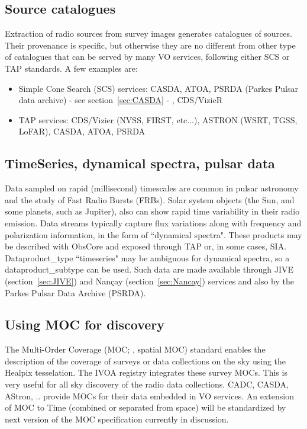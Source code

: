 \documentclass[11pt,a4paper]{ivoa}
\begin{document}
\subsection{Source catalogues}
Extraction of radio sources from survey images generates catalogues of sources. Their provenance is specific, but otherwise they are no different from other type of catalogues that can be served by many VO services, following either SCS \citep{std:SCS} or TAP standards. A few examples are:
\begin{itemize}
\item Simple Cone Search (SCS) services: CASDA, ATOA, PSRDA (Parkes Pulsar data archive) - see section~\ref{sec:CASDA} - , CDS/VizieR
\item TAP services: CDS/Vizier (NVSS, FIRST, etc...), ASTRON (WSRT, TGSS, LoFAR), CASDA, ATOA, PSRDA 
\end{itemize}


\subsection{TimeSeries, dynamical spectra, pulsar data}

Data sampled on rapid (millisecond) timescales are common in pulsar astronomy and the study of Fast Radio Bursts (FRBs). 
Solar system objects (the Sun, and some planets, such as Jupiter), also can show rapid time variability in their radio emission. Data streams typically capture flux variations along with frequency and polarization information, in the form of ``dynamical spectra".
These products may be described with ObsCore and exposed through TAP or, in some cases, SIA. Dataproduct\_type ``timeseries" may be ambiguous for dynamical spectra, so a dataproduct\_subtype can be used. Such data are made available through JIVE (section~\ref{sec:JIVE}) and Nançay (section~\ref{sec:Nancay}) services and also  by the Parkes Pulsar Data Archive (PSRDA).

\subsection{Using MOC for discovery}

The Multi-Order Coverage (MOC; \cite{2019ivoa.spec.1007F}, spatial MOC) standard enables the description of the coverage of surveys or data collections on the sky using the Healpix tesselation. The IVOA registry integrates these survey MOCs. This is very useful for all sky discovery of the radio data collections. CADC, CASDA, AStron, .. provide MOCs for their data embedded in VO services. An extension of MOC to Time (combined or separated from space) will be standardized by next version of the MOC specification currently in discussion.
\end{document}
